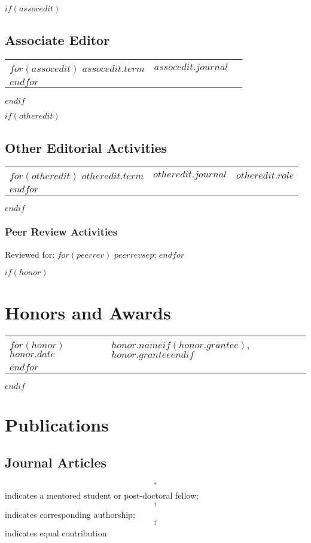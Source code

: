 \documentclass[martgin, line]{article}
\begin{document}
$if(assocedit)$
\subsection*{Associate Editor}
\begin{tabular}{lll}
$for(assocedit)$
$assocedit.term$&
$assocedit.journal$
\\
$endfor$
\end{tabular}
$endif$

$if(otheredit)$
\subsection*{Other Editorial Activities}
\begin{tabular}{lll}
$for(otheredit)$
$otheredit.term$&
$otheredit.journal$&
$otheredit.role$
\\
$endfor$
\end{tabular}
$endif$

\subsubsection*{Peer Review Activities}
Reviewed for:
$for(peerrev)$
$peerrev$$sep$;
$endfor$

$if(honor)$
\section*{Honors and Awards}
\begin{tabular}{lp{5.5in}}
$for(honor)$
$honor.date$&
$honor.name$$if(honor.grantee)$, $honor.grantee$$endif$
\\
$endfor$
\end{tabular}
$endif$


\section*{Publications}
\subsection*{Journal Articles}

\begin{footnotesize}
    $$^*$$ indicates a mentored student or post-doctoral fellow;
    $$^\dagger$$ indicates corresponding authorship;
    $$^\ddagger$$ indicates equal contribution
  \end{footnotesize}

\begin{enumerate}
  
\end{enumerate}
\end{document}
